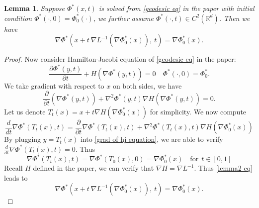 \documentclass{article}
\newtheorem{lemma}{Lemma}
\begin{document}
\begin{lemma}\label{vf of HJ}
  Suppose $\Phi^*(x,t)$ is solved from \eqref{geodesic eq} in the paper with initial condition $\Phi^*(\cdot, 0) = \Phi^*_0(\cdot)$, we further assume $\Phi^*(\cdot, t)\in C^2(\mathbb{R}^d)$. Then we have
  \begin{equation}
    \nabla\Phi^*(x+t~\nabla L^{-1}(\nabla\Phi^*_0(x)), ~t) = \nabla\Phi^*_0(x).  \label{gradient of solution to hj}
  \end{equation}
\end{lemma}

\begin{proof}
   Now consider Hamilton-Jacobi equation of \eqref{geodesic eq} in the paper:
   \begin{equation*}
      \frac{\partial \Phi^*(y,t)}{\partial t} + H(\nabla\Phi^*(y,t)) = 0 \quad \Phi^*(\cdot, 0) = \Phi^*_0.
   \end{equation*}
   We take gradient with respect to $x$ on both sides, we have
   \begin{equation}
      \frac{\partial}{\partial t}(\nabla\Phi^*(y,t)) + \nabla^2\Phi^*(y,t)\nabla H( \nabla\Phi^*(y,t) ) = 0.  \label{grad of hj equation}
   \end{equation}
   Let us denote $T_t(x) = x+t\nabla H(\nabla\Phi^*_0(x))$ for simplicity. We now compute
   \begin{equation*}
      \frac{d}{dt}\nabla\Phi^*(T_t (x), t) = \frac{\partial}{\partial t}\nabla\Phi^*(T_t(x), t) + \nabla^2 \Phi^*(T_t(x), t) \nabla H(\nabla\Phi^*_0(x))
   \end{equation*}
   By plugging $y=T_t(x)$ into \eqref{grad of hj equation}, we are able to verify $\frac{d}{dt}\nabla\Phi^*(T_t (x), t) = 0$. Thus 
   \begin {equation}
      \nabla\Phi^*(T_t (x), t) = \nabla \Phi^*(T_0(x), 0) = \nabla\Phi^*_0(x) \quad \textrm{for} ~~ t\in [0,1]  \label{lemma2 eq}
   \end{equation}
   Recall $H$ defined in the paper, we can verify that $\nabla H = \nabla L^{-1}$. Thus \eqref{lemma2 eq} leads to
   \begin{equation*}
     \nabla\Phi^*(x+t~\nabla L^{-1}(\nabla\Phi^*_0(x)), ~t) = \nabla\Phi^*_0(x).
   \end{equation*}

\end{proof}
\end{document}
